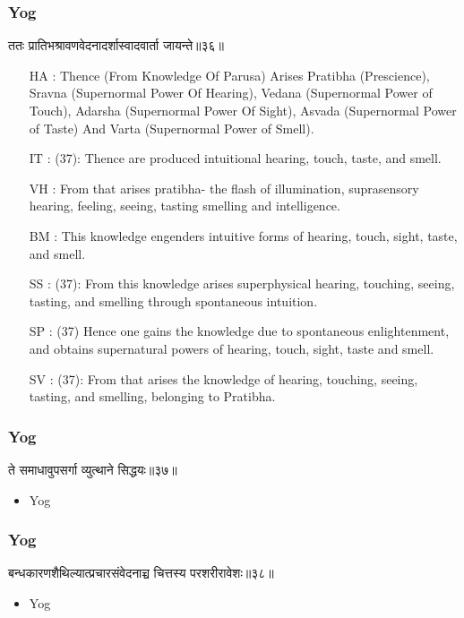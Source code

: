 \begin{frame}[fragile]\frametitle{Yog}
\begin{sanskrit}
ततः प्रातिभश्रावणवेदनादर्शास्वादवार्ता जायन्ते॥३६॥
\end{sanskrit}

	\begin{itemize}
	\item [HA]: Thence (From Knowledge Of Parusa) Arises Pratibha (Prescience), Sravna (Supernormal Power Of Hearing), Vedana (Supernormal Power of Touch), Adarsha (Supernormal Power Of Sight), Asvada (Supernormal Power of Taste) And Varta (Supernormal Power of Smell).
	\item [IT]: (37): Thence are produced intuitional hearing, touch, taste, and smell.
	\item [VH]: From that arises pratibha- the flash of illumination, suprasensory hearing, feeling, seeing, tasting smelling and intelligence.
	\item [BM]: This knowledge engenders intuitive forms of hearing, touch, sight, taste, and smell.
	\item [SS]: (37): From this knowledge arises superphysical hearing, touching, seeing, tasting, and smelling through spontaneous intuition.
	\item [SP]: (37) Hence one gains the knowledge due to spontaneous enlightenment, and obtains supernatural powers of hearing, touch, sight, taste and smell.
	\item [SV]: (37): From that arises the knowledge of hearing, touching, seeing, tasting, and smelling, belonging to Pratibha. 
	\end{itemize}
\end{frame}

\begin{frame}[fragile]\frametitle{Yog}
\begin{sanskrit}
ते समाधावुपसर्गा व्युत्थाने सिद्धयः॥३७॥
\end{sanskrit}
	\begin{itemize}
	\item Yog 
	\end{itemize}
\end{frame}


\begin{frame}[fragile]\frametitle{Yog}
\begin{sanskrit}
बन्धकारणशैथिल्यात्प्रचारसंवेदनाच्च चित्तस्य परशरीरावेशः॥३८॥
\end{sanskrit}
	\begin{itemize}
	\item Yog 
	\end{itemize}
\end{frame}


